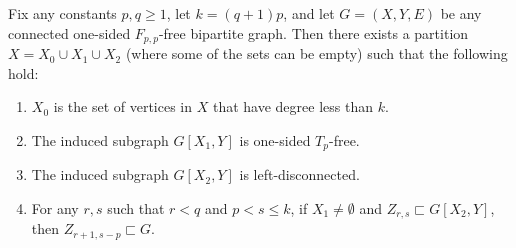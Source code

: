 \documentclass{theoretics}
\begin{document}
\begin{lemma}
\label{lemma:Fpq structure}
Fix any constants $p,q \geq 1$, let $k = (q+1)p$, and let $G = (X,Y,E)$ be any
connected one-sided $F_{p,p}$-free bipartite graph. 
Then there exists a partition $X = X_0 \cup X_1 \cup X_2$ (where some of the sets can be empty) such that the following hold:
\begin{enumerate}[label=\textup{(\arabic*)}]
	\item $X_0$ is the set of vertices in $X$ that have degree less than $k$.
	\item The induced subgraph $G[X_1,Y]$ is one-sided $T_p$-free.
	\item The induced subgraph $G[X_2,Y]$ is left-disconnected.
	\item For any $r, s$ such that $r < q$ and $p < s \leq k$, if $X_1 \neq \emptyset$ and $Z_{r,s} \sqsubset G[X_2,Y]$, then $Z_{r+1,s-p} \sqsubset G$.
\end{enumerate}
\end{lemma}
\end{document}
